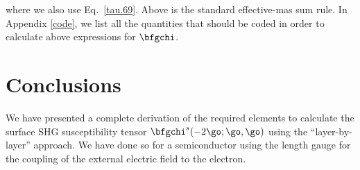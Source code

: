 \documentclass[floatfix,prb,aps,superscriptaddress,11pt,preprint,letterpaper]{revtex4}
\begin{document}
where we also use Eq.~\eqref{tau.69}. Above
is the standard effective-mas sum rule.\cite{ashcroft_solid_1976} 
In Appendix \ref{code}, we list all the quantities that should be
coded in order to calculate above expressions for $\bfgchi$.


\section{Conclusions}\label{con}

We have presented a complete derivation of the required elements to
calculate the surface SHG susceptibility tensor $\bfgchi^s(-2\go;\go,\go)$ 
using the ``layer-by-layer'' approach. We have done so for a
semiconductor using the 
length gauge for the coupling of the external electric field to the electron. 

\appendix
%
%
%
%
%
%

%

\end{document}
